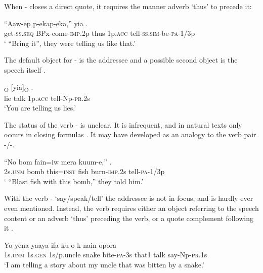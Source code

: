 When - closes a direct quote, it requires the manner adverb  `thus' to precede it:

\ea%
\label{ex:3:x315}
\gll ``Aaw-ep p-ekap-eka,''  yia .\\
get-\textsc{ss}.\textsc{seq} BPx-come-\textsc{imp}.2p thus 1p.\textsc{acc} tell-\textsc{ss}.\textsc{sim}-be-\textsc{pa}-1/3p\\
\glt` ``Bring it'', they were telling us like that.'
\z

The default object for - is the addressee  and a possible second object is the speech itself .

\ea%
\label{ex:3:x316}
\textsubscript{O} [yia]\textsubscript{O} . \\
lie talk 1p.\textsc{acc} tell-Np-\textsc{pr}.2s \\
\glt`You are telling us lies.'
\z

The status of the verb - is unclear. It is infrequent, and in natural texts only occurs in closing formulas . It may have developed as an analogy to the verb pair -/-.

\ea%
\label{ex:3:x317}
\gll ``No bom fain=iw mera kuum-e,'' . \\
2s.\textsc{unm} bomb this=\textsc{inst} fish burn-\textsc{imp}.2s tell-\textsc{pa}-1/3p \\
\glt` ``Blast fish with this bomb,'' they told him.'
\z

With the verb - `say/speak/tell' the addressee is not in focus, and is hardly ever even mentioned. Instead, the verb requires either an object referring to the speech content  or an adverb  `thus'  preceding the verb, or a quote complement following it . 

\ea%
\label{ex:3:x318}
\gll Yo yena yaaya ifa ku-o-k nain opora \\
1s.\textsc{unm} 1s.\textsc{gen} 1s/p.uncle snake bite-\textsc{pa}-3s that1 talk say-Np-\textsc{pr}.1s\\
\glt`I am telling a story about my uncle that was bitten by a snake.'
\z

